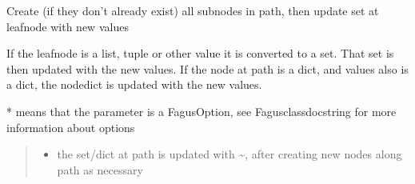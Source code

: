 \documentclass[a4paper,10pt,english]{sphinxmanual}
\begin{document}
\begin{fulllineitems}
\begin{fulllineitems}
\label{\detokenize{fagus.fagus:fagus.fagus.Fagus.update}}
\pysigstartsignatures
{}
\pysigstopsignatures
\sphinxAtStartPar
Create (if they don’t already exist) all sub\sphinxhyphen{}nodes in path, then update set at leaf\sphinxhyphen{}node with new values

\sphinxAtStartPar
If the leaf\sphinxhyphen{}node is a list, tuple or other value it is converted to a set. That set is then updated with the new
values. If the node at path is a dict, and values also is a dict, the node\sphinxhyphen{}dict is updated with the new values.

\sphinxAtStartPar
* means that the parameter is a FagusOption, see Fagus\sphinxhyphen{}class\sphinxhyphen{}docstring for more information about options
\begin{quote}\begin{description}
\begin{itemize}
\item {}
\sphinxAtStartPar
{} \textendash{} the set/dict at path is updated with \textasciitilde{}, after creating new nodes along path as necessary


\end{itemize}
\end{description}
\end{quote}
\end{fulllineitems}
\end{fulllineitems}
\end{document}
